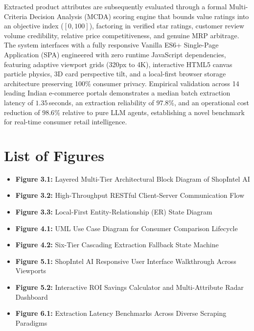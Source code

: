 \documentclass[12pt,a4paper,oneside]{report}
\begin{document}
Extracted product attributes are subsequently evaluated through a formal Multi-Criteria Decision Analysis (MCDA) scoring engine that bounds value ratings into an objective index ($[0, 100]$), factoring in verified star ratings, customer review volume credibility, relative price competitiveness, and genuine MRP arbitrage. The system interfaces with a fully responsive Vanilla ES6+ Single-Page Application (SPA) engineered with zero runtime JavaScript dependencies, featuring adaptive viewport grids (320px to 4K), interactive HTML5 canvas particle physics, 3D card perspective tilt, and a local-first browser storage architecture preserving 100\% consumer privacy. Empirical validation across 14 leading Indian e-commerce portals demonstrates a median batch extraction latency of $1.35$\,seconds, an extraction reliability of $97.8\%$, and an operational cost reduction of $98.6\%$ relative to pure LLM agents, establishing a novel benchmark for real-time consumer retail intelligence.

\newpage

\tableofcontents
\newpage

\chapter*{List of Figures}
\begin{itemize}
    \item \textbf{Figure 3.1:} Layered Multi-Tier Architectural Block Diagram of ShopIntel AI 
    \item \textbf{Figure 3.2:} High-Throughput RESTful Client-Server Communication Flow 
    \item \textbf{Figure 3.3:} Local-First Entity-Relationship (ER) State Diagram 
    \item \textbf{Figure 4.1:} UML Use Case Diagram for Consumer Comparison Lifecycle 
    \item \textbf{Figure 4.2:} Six-Tier Cascading Extraction Fallback State Machine 
    \item \textbf{Figure 5.1:} ShopIntel AI Responsive User Interface Walkthrough Across Viewports 
    \item \textbf{Figure 5.2:} Interactive ROI Savings Calculator and Multi-Attribute Radar Dashboard 
    \item \textbf{Figure 6.1:} Extraction Latency Benchmarks Across Diverse Scraping Paradigms 
\end{itemize}
\end{document}
